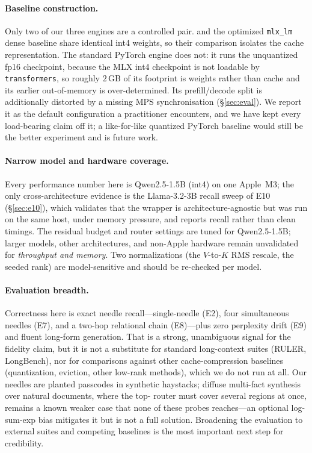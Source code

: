 \paragraph{Baseline construction.} Only two of our three engines are a controlled pair. \dkv{}
and the optimized \texttt{mlx\_lm} dense baseline share identical int4 weights, so their
comparison isolates the cache representation. The standard PyTorch engine does not: it runs the
unquantized fp16 checkpoint, because the MLX int4 checkpoint is not loadable by
\texttt{transformers}, so roughly $2$\,GB of its footprint is weights rather than cache and its
earlier out-of-memory is over-determined. Its prefill/decode split is additionally distorted by a
missing MPS synchronisation (\S\ref{sec:eval}). We report it as the default configuration a
practitioner encounters, and we have kept every load-bearing claim off it; a like-for-like
quantized PyTorch baseline would still be the better experiment and is future work.

\paragraph{Narrow model and hardware coverage.} Every performance number here is Qwen2.5-1.5B
(int4) on one Apple~M3; the only cross-architecture evidence is the Llama-3.2-3B recall sweep of
E10 (\S\ref{sec:e10}), which validates that the wrapper is architecture-agnostic but was run on
the same host, under memory pressure, and reports recall rather than clean timings. The residual
budget and router settings are tuned for Qwen2.5-1.5B; larger models, other architectures, and
non-Apple hardware remain unvalidated for \emph{throughput and memory}. Two normalizations (the
$V$-to-$K$ RMS rescale, the seeded rank) are model-sensitive and should be re-checked per model.

\paragraph{Evaluation breadth.} Correctness here is exact needle recall---single-needle
(E2), four simultaneous needles (E7), and a two-hop relational chain (E8)---plus zero perplexity
drift (E9) and fluent long-form generation. That is a strong, unambiguous signal for the fidelity
claim, but it is not a substitute for standard long-context suites (RULER, LongBench), nor for
comparisons against other cache-compression baselines (quantization, eviction, other low-rank
methods), which we do not run at all. Our needles are planted passcodes in synthetic haystacks;
diffuse multi-fact synthesis over natural documents, where the top-\topk{} router must cover
several regions at once, remains a known weaker case that none of these probes reaches---an
optional log-sum-exp bias mitigates it but is not a full solution. Broadening the evaluation to
external suites and competing baselines is the most important next step for credibility.

